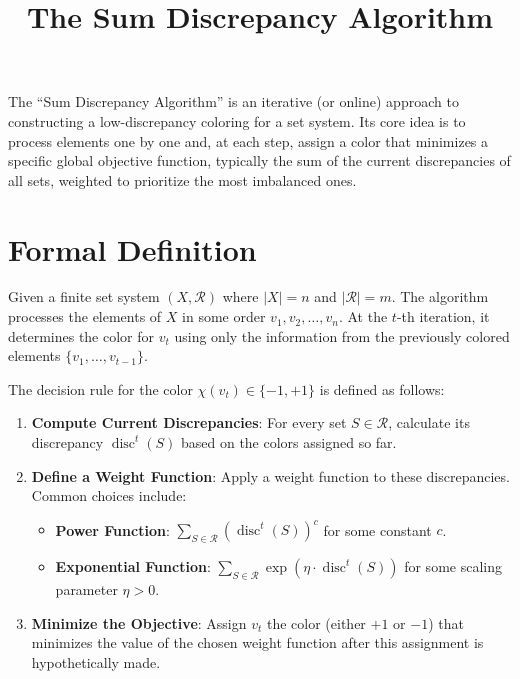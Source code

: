 \documentclass[11pt]{article}
\title{The Sum Discrepancy Algorithm}
\author{}
\date{}
\DeclareMathOperator{\disc}{disc}
\begin{document}
\maketitle

The ``Sum Discrepancy Algorithm'' is an iterative (or online) approach
to constructing a low-discrepancy coloring for a set system. Its core
idea is to process elements one by one and, at each step, assign a color
that minimizes a specific global objective function, typically the sum
of the current discrepancies of all sets, weighted to prioritize the
most imbalanced ones.

\section{Formal Definition}

Given a finite set system \((X, \mathcal{R})\) where \(|X| = n\) and
\(|\mathcal{R}| = m\). The algorithm processes the elements of \(X\)
in some order \(v_1, v_2, \dots, v_n\). At the \(t\)-th iteration, it
determines the color for \(v_t\) using only the information from the
previously colored elements \(\{v_1, \dots, v_{t-1}\}\).

The decision rule for the color \(\chi(v_t) \in \{-1, +1\}\) is defined
as follows:

\begin{enumerate}
  \item \textbf{Compute Current Discrepancies}: For every set
        \(S \in \mathcal{R}\), calculate its discrepancy
        \(\disc^t(S)\) based on the colors assigned so far.
  \item \textbf{Define a Weight Function}: Apply a weight function to
        these discrepancies. Common choices include:
        \begin{itemize}
          \item \textbf{Power Function}:
                \(\sum_{S \in \mathcal{R}} (\disc^t(S))^c\)
                for some constant \(c\).
          \item \textbf{Exponential Function}:
                \(\sum_{S \in \mathcal{R}} \exp(\eta \cdot \disc^t(S))\)
                for some scaling parameter \(\eta > 0\).
        \end{itemize}
  \item \textbf{Minimize the Objective}: Assign \(v_t\) the color
        (either \(+1\) or \(-1\)) that minimizes the value of the chosen
        weight function after this assignment is hypothetically made.
\end{enumerate}
\end{document}
